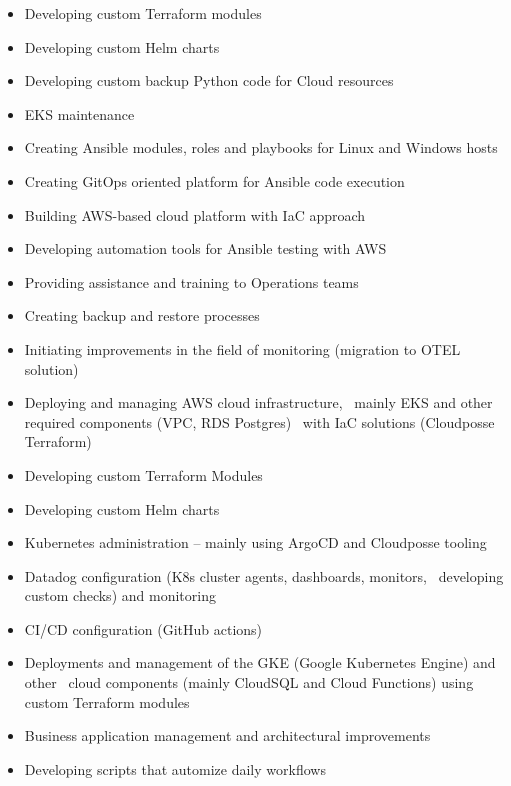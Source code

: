 \documentclass[10pt,a4paper,ragged2e]{altacv}
\begin{document}
\makecvheader
{}

\begin{itemize}
  \item Developing custom Terraform modules
  \item Developing custom Helm charts
  \item Developing custom backup Python code for Cloud resources
  \item EKS maintenance
  \item Creating Ansible modules, roles and playbooks for Linux and Windows hosts
  \item Creating GitOps oriented platform for Ansible code execution
  \item Building AWS-based cloud platform with IaC approach
  \item Developing automation tools for Ansible testing with AWS
  \item Providing assistance and training to Operations teams
  \item Creating backup and restore processes
  \item Initiating improvements in the field of monitoring (migration to OTEL solution)
\end{itemize}

\divider

\begin{itemize}
  \item Deploying and managing AWS cloud infrastructure, \
    mainly EKS and other required components (VPC, RDS Postgres) \
    with IaC solutions (Cloudposse Terraform)
  \item Developing custom Terraform Modules
  \item Developing custom Helm charts
  \item Kubernetes administration -- mainly using ArgoCD and Cloudposse tooling
  \item Datadog configuration (K8s cluster agents, dashboards, monitors, \
    developing custom checks) and monitoring
  \item CI/CD configuration (GitHub actions)
\end{itemize}
\divider

\begin{itemize}
  \item Deployments and management of the GKE (Google Kubernetes Engine) and other \
    cloud components (mainly CloudSQL and Cloud Functions) using custom Terraform modules
  \item Business application management and architectural improvements
  \item Developing scripts that automize daily workflows
\end{itemize}
\divider
\end{document}
